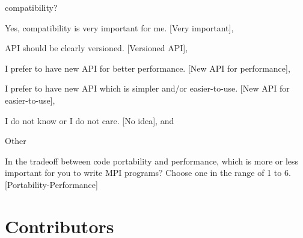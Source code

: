 \documentclass[preprint,5p,times]{elsarticle}
\def\Countries{Contributors\xspace{}}%
\begin{document}
{{\begin{description}[leftmargin=3mm]
    compatibility?
    \begin{inparaenum}[{\bf C}1)]
    \item Yes, compatibility is very important for me. [Very important],
    \item API should be clearly versioned. [Versioned API],
    \item I prefer to have new API for better performance. [New API for performance],
    \item I prefer to have new API which is simpler and/or
      easier-to-use. [New API for easier-to-use],
    \item I do not know or I do not care. [No idea], and
    \item Other
    \end{inparaenum}
  \item[Q29:] In the tradeoff between code portability and performance,
    which is more or less important for you to write MPI programs?
    Choose one in the range of 1 to 6. [Portability-Performance]
  \end{description}
}

\section{\Countries}
\label{app:countries}

}
\end{document}
